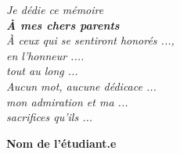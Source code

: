 \begin{dedic}
\begin{center}
\it \Large
   \vspace{5mm}
Je dédie ce mémoire \\
\vspace{5mm}
{\bf À mes chers parents} \\
\vspace{5mm}
À ceux qui se sentiront honorés ..., \\
\vspace{0.5mm}
en l’honneur .... \\
\vspace{0.5mm}
tout au long ... \\
\vspace{4mm}
Aucun mot, aucune dédicace ... \\
\vspace{0.5mm}
mon admiration et ma ... \\
\vspace{0.5mm}
sacrifices qu’ils ... \\
\end{center}
\vspace{4mm}
\vspace{8mm}
\begin{flushright}
     {\bf Nom de l'étudiant.e}
\end{flushright}
\newpage
\thispagestyle{empty}
\end{dedic}


